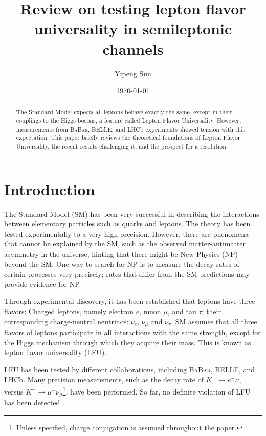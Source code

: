 \documentclass[12pt,letterpaper]{article}
\title{Review on testing lepton flavor universality in semileptonic channels}
\author{Yipeng Sun}
\affil{Department of Physics, University of Maryland}
\date{\today}
\def\BaBar/{\textsc{BaBar}}
\begin{document}
\maketitle

\begin{abstract}
    The Standard Model expects all leptons behave exactly the same, except in their couplings to the Higgs bosons, a feature called Lepton Flavor Universality.
    However, measurements from \BaBar/, BELLE, and LHCb experiments showed tension with this expectation.
    This paper briefly reviews the theoretical foundations of Lepton Flavor Universality, the recent results challenging it, and the prospect for a resolution.
\end{abstract}

\section{Introduction}
The Standard Model (SM) has been very successful in describing the interactions
between elementary particles such as quarks and leptons.
The theory has been tested experimentally to a very high precision.
However, there are phenomena that cannot be explained by the SM, such as
the observed matter-antimatter asymmetry in the universe, hinting that there might be New Physics (NP) beyond the SM.
One way to search for NP is to measure the decay rates of certain processes
very precisely;
rates that differ from the SM predictions may provide evidence for NP.

Through experimental discovery, it has been established that leptons have three
flavors:
Charged leptons, namely electron $e$, muon $\mu$, and tau $\tau$;
their corresponding charge-neutral neutrinos: $\nu_e$, $\nu_\mu$ and $\nu_\tau$.
SM assumes that all three flavors of leptons participate in all
interactions with the same strength, except for the Higgs mechanism through which
they acquire their mass.
This is known as lepton flavor universality (LFU).

LFU has been tested by different collaborations, including \BaBar/, BELLE, and LHCb.
Many precision measurements, such as the decay rate
of $K^- \rightarrow e^- \nu_e$ versus $K^- \rightarrow \mu^- \nu_\mu$\footnote{
    Unless specified, charge conjugation is assumed throughout the paper.
}, have been performed.
So far, no definite violation of LFU has been detected \cite{Ciezarek:2017yzh}.
\end{document}
